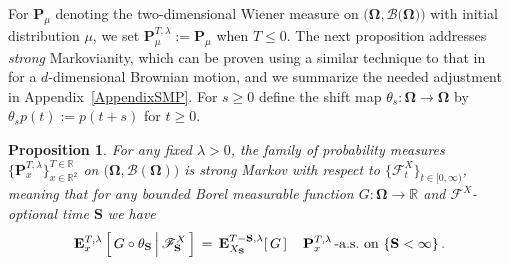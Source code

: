 \documentclass[10pt]{article}
\numberwithin{equation}{section}
\newtheorem{proposition}[theorem]{Proposition}
\theoremstyle{definition}
\newcommand{\R}{{\mathbb R}}
\begin{document}
For $\mathbf{P}_{\mu}$ denoting the  two-dimensional Wiener measure on $\big(\boldsymbol{\Omega},\mathscr{B}\big(\boldsymbol{\Omega}\big)  \big)$ with initial distribution $\mu$, we set  $\mathbf{P}^{T,\lambda}_{\mu}:=\mathbf{P}_{\mu}$ when $T\leq 0$. The next proposition addresses \textit{strong} Markovianity, which can be proven using a similar technique to that in~\cite[Sec.\ 2.6C]{Karatzas} for a $d$-dimensional Brownian motion, and we summarize the needed adjustment in Appendix~\ref{AppendixSMP}.  For  $s\geq 0$ define the  shift map  $\theta_s:\boldsymbol{\Omega}\rightarrow \boldsymbol{\Omega}$ by $\theta_s p(t):=p(t+s)$ for $t\geq 0$. 
\begin{proposition}\label{PropStrongMarkov} For any fixed $\lambda >0$, the family of probability measures  $\{\mathbf{P}^{T,\lambda}_{x}\}^{ T\in \R}_{ x\in \R^2}  $ on $\big(\boldsymbol{\Omega},\mathscr{B}( \boldsymbol{\Omega} )\big)$ is  strong Markov with respect to $\{\mathscr{F}_t^X\}_{t\in [0,\infty)}$, meaning that for any bounded Borel measurable function $G: \boldsymbol{\Omega} \rightarrow \R$ and $\mathscr{F}^X$-optional time $\mathbf{S}$   we have
$$  \mathbf{E}_{x  }^{T,\lambda}\left[\, G\circ \theta_{\mathbf{S}} \,\Big|\,\mathscr{F}_{\mathbf{S} }^X \,\right] \,=\, \mathbf{E}_{ X_{\mathbf{S}} }^{T-\mathbf{S},\lambda }[\, G\,] \hspace{.4cm} \text{$\mathbf{P}^{T,\lambda}_{x}$\,-a.s.\ on}\,\,\{\mathbf{S}<\infty  \}\,. $$
\end{proposition}
 
\end{document}
